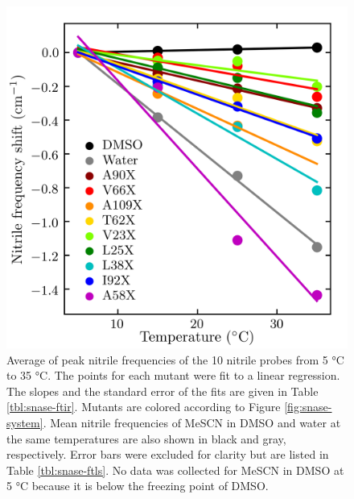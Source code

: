 \begin{figure}
    \center
    \includegraphics[width=\single]{figures-snase/ftls.png}
    \caption[FTLS of the nitrile in each location]{
        Average of peak nitrile frequencies of the 10 nitrile probes from 5 \si{\celsius} to 35 \si{\celsius}. 
        The points for each mutant were fit to a linear regression. 
        The slopes and the standard error of the fits are given in Table \ref{tbl:snase-ftir}.  
        Mutants are colored according to Figure \ref{fig:snase-system}. 
        Mean nitrile frequencies of MeSCN in DMSO and water at the same temperatures are also shown in black and gray, respectively. 
        Error bars were excluded for clarity but are listed in Table \ref{tbl:snase-ftls}. 
        No data was collected for MeSCN in DMSO at 5 \si{\celsius} because it is below the freezing point of DMSO.
    }
    \label{fig:snase-ftls}
\end{figure}

